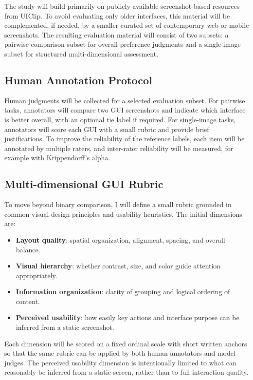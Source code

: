 \documentclass[pdflatex,sn-mathphys-num]{sn-jnl}
\begin{document}
The study will build primarily on publicly available screenshot-based resources from
UIClip. To avoid evaluating only older interfaces, this material will be complemented,
if needed, by a smaller curated set of contemporary web or mobile screenshots. The
resulting evaluation material will consist of two subsets: a pairwise comparison subset
for overall preference judgments and a single-image subset for structured
multi-dimensional assessment.

\subsection{Human Annotation Protocol}

Human judgments will be collected for a selected evaluation subset. For pairwise tasks,
annotators will compare two GUI screenshots and indicate which interface is better
overall, with an optional tie label if required. For single-image tasks, annotators
will score each GUI with a small rubric and provide brief justifications. To improve
the reliability of the reference labels, each item will be annotated by multiple
raters, and inter-rater reliability will be measured, for example with
Krippendorff's alpha.

\subsection{Multi-dimensional GUI Rubric}

To move beyond binary comparison, I will define a small rubric grounded in common
visual design principles and usability heuristics. The initial dimensions are:

\begin{itemize}
    \item \textbf{Layout quality}: spatial organization, alignment, spacing, and
    overall balance.
    \item \textbf{Visual hierarchy}: whether contrast, size, and color guide attention
    appropriately.
    \item \textbf{Information organization}: clarity of grouping and logical ordering
    of content.
    \item \textbf{Perceived usability}: how easily key actions and interface purpose
    can be inferred from a static screenshot.
\end{itemize}

Each dimension will be scored on a fixed ordinal scale with short written anchors so
that the same rubric can be applied by both human annotators and model judges. The
perceived usability dimension is intentionally limited to what can reasonably be
inferred from a static screen, rather than to full interaction quality.
\end{document}

